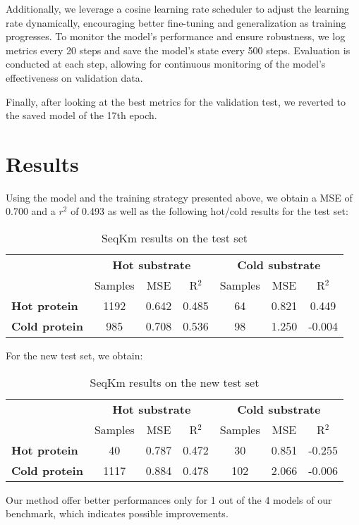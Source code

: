Additionally, we leverage a cosine learning rate scheduler to adjust the learning rate dynamically, 
encouraging better fine-tuning and generalization as training progresses. To monitor the model's performance 
and ensure robustness, we log metrics every 20 steps and save the model's state every 500 steps. 
Evaluation is conducted at each step, allowing for continuous monitoring of the model's effectiveness on 
validation data. 

Finally, after looking at the best metrics for the validation test, we reverted to the saved model of the
 17th epoch. 

 \section{Results}

 Using the model and the training strategy presented above, we obtain a MSE of 0.700 and a $r^2$ of 0.493 
 as well as the following hot/cold results for the test set:

 \begin{table}[ht]
  \centering
  \begin{tabular}{lcccccc}
  \hline
   & \multicolumn{3}{c}{\textbf{Hot substrate}} & \multicolumn{3}{c}{\textbf{Cold substrate}} \\
   & Samples & MSE & R\(^2\) & Samples & MSE & R\(^2\) \\ \hline
  \textbf{Hot protein}  & 1192 & 0.642 & 0.485 & 64 & 0.821 & 0.449 \\
  \textbf{Cold protein} & 985 & 0.708 & 0.536 & 98 & 1.250 & -0.004 \\ \hline
  \end{tabular}
  \caption{SeqKm results on the test set}
  \label{tab:summary_performance}
 \end{table}



For the new test set, we obtain:

\begin{table}[ht]
  \centering
  \begin{tabular}{lcccccc}
  \hline
   & \multicolumn{3}{c}{\textbf{Hot substrate}} & \multicolumn{3}{c}{\textbf{Cold substrate}} \\
   & Samples & MSE & R\(^2\) & Samples & MSE & R\(^2\) \\ \hline
  \textbf{Hot protein} & 40 & 0.787 & 0.472 & 30 & 0.851 & -0.255 \\
  \textbf{Cold protein} & 1117 & 0.884 & 0.478 & 102 & 2.066 & -0.006 \\ \hline
  \end{tabular}
  \caption{SeqKm results on the new test set}
  \label{tab:updated_summary_performance}
\end{table}

Our method offer better performances only for 1 out of the 4 models of our benchmark, which indicates 
possible improvements.